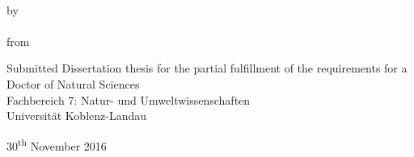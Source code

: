 
\begin{titlepage}
    \begin{center}
        \vspace*{3cm}
        \begingroup
            \textbf{\LARGE\spacedallcaps{\myTitleOnTitlePageLineOne}}\\[0.8em]
            \spacedallcaps{\myTitleOnTitlePageLineTwo}
        \endgroup
        
        \vfill

        \begingroup
            by\\[1em]
            \Large \spacedlowsmallcaps{\myName} \\
            \small from \spacedlowsmallcaps{\myLocation}
        \endgroup

        \vfill

        \begingroup
            \small
        	Submitted Dissertation thesis for the partial fulfillment of the requirements for a \\
        	Doctor of Natural Sciences \\
            Fachbereich 7: Natur- und Umweltwissenschaften \\
        	Universität Koblenz-Landau
        \endgroup

        \vfill

        30\textsuperscript{th} November 2016
                   

    \end{center}       
\end{titlepage}   
 
